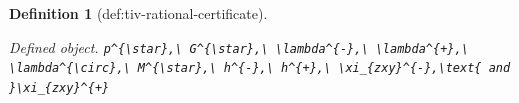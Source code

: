 \documentclass{article}
\newtheorem{definition}{Definition}
\begin{document}
\begin{definition}[def:tiv-rational-certificate]\label{def:tiv-rational-certificate}
\par\smallskip\noindent\emph{Defined object.} \texttt{p\textasciicircum{}\{\textbackslash{}\allowbreak{}star\}\allowbreak{},\allowbreak{}\textbackslash{}\allowbreak{} G\textasciicircum{}\{\textbackslash{}\allowbreak{}star\}\allowbreak{},\allowbreak{}\textbackslash{}\allowbreak{} \textbackslash{}\allowbreak{}lambda\textasciicircum{}\{-\allowbreak{}\}\allowbreak{},\allowbreak{}\textbackslash{}\allowbreak{} \textbackslash{}\allowbreak{}lambda\textasciicircum{}\{+\allowbreak{}\}\allowbreak{},\allowbreak{}\textbackslash{}\allowbreak{} \textbackslash{}\allowbreak{}lambda\textasciicircum{}\{\textbackslash{}\allowbreak{}circ\}\allowbreak{},\allowbreak{}\textbackslash{}\allowbreak{} M\textasciicircum{}\{\textbackslash{}\allowbreak{}star\}\allowbreak{},\allowbreak{}\textbackslash{}\allowbreak{} h\textasciicircum{}\{-\allowbreak{}\}\allowbreak{},\allowbreak{}\textbackslash{}\allowbreak{} h\textasciicircum{}\{+\allowbreak{}\}\allowbreak{},\allowbreak{}\textbackslash{}\allowbreak{} \textbackslash{}\allowbreak{}xi\_\allowbreak{}\{zxy\}\allowbreak{}\textasciicircum{}\{-\allowbreak{}\}\allowbreak{},\allowbreak{}\textbackslash{}\allowbreak{}text\{ and \}\allowbreak{}\textbackslash{}\allowbreak{}xi\_\allowbreak{}\{zxy\}\allowbreak{}\textasciicircum{}\{+\allowbreak{}\}\allowbreak{}}

\end{definition}
\end{document}
